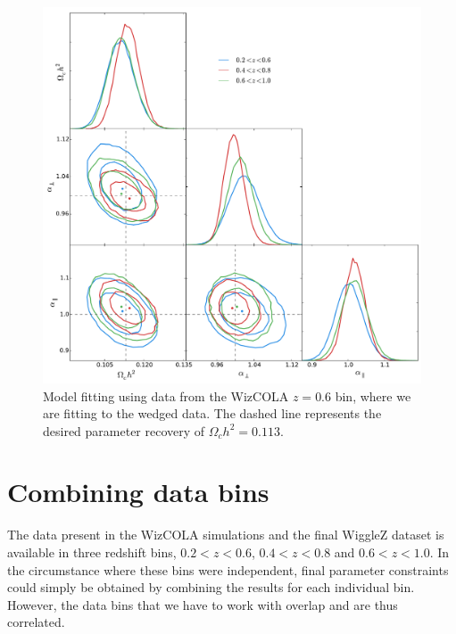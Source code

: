 \documentclass[titlesmallcaps, examinerscopy, copyrightpage]{uqthesis}
\begin{document}
\begin{figure}[h!]
  \begin{center}
    \includegraphics[width=\textwidth]{images/wizwedge.pdf}
  \end{center}
  \caption{Model fitting using data from the WizCOLA $z=0.6$ bin, where we are fitting to the wedged data. The dashed line represents the desired parameter recovery of $\Omega_c h^2 = 0.113$. }
  \label{fig:wizwedge}
\end{figure}











\newpage\phantom{blabla}\newpage
\section{Combining data bins}

The data present in the WizCOLA simulations and the final WiggleZ dataset is available in three redshift bins, $0.2 < z < 0.6$, $0.4 < z < 0.8$ and $0.6 < z < 1.0$. In the circumstance where these bins were independent, final parameter constraints could simply be obtained by combining the results for each individual bin. However, the data bins that we have to work with overlap and are thus correlated. 
\end{document}
